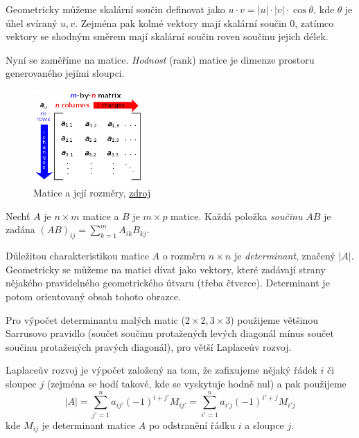 Geometricky můžeme skalární součin definovat jako
$u \cdot v = \lvert u \rvert \cdot \lvert v \rvert \cdot \cos \theta$,
kde $\theta$ je úhel svíraný $u,v$. Zejména pak kolmé
vektory mají skalární součin 0, zatímco vektory se shodným směrem
mají skalární součin roven součinu jejich délek.



Nyní se zaměříme na matice. {\em Hodnost} (rank) matice je dimenze
prostoru generovaného jejími sloupci.

\begin{figure}[h]
    \centering
    \includegraphics[width=120pt]{matrix.png}
    \caption{Matice a její rozměry, \href{https://commons.wikimedia.org/wiki/File:Matrix.svg}{zdroj}}
\end{figure}


\begin{definition}
    Nechť $A$ je $n \times m$ matice a $B$ je $m \times p$ matice.
    Každá položka {\em součinu} $AB$ je zadána
    $(AB)_{ij} = \sum^{m}_{k = 1} A_{ik} B_{kj}$.
\end{definition}


Důležitou charakteristikou matice $A$ o rozměru $n \times n$ je {\em
determinant}, značený $\lvert A \rvert$. Geometricky se můžeme na matici
dívat jako vektory, které zadávají strany nějakého pravidelného
geometrického útvaru (třeba čtverce). Determinant je potom orientovaný
obsah tohoto obrazce.

Pro výpočet determinantu malých matic ($2\times2,
3\times3$) použijeme většinou Sarrusovo pravidlo (součet součinu
protažených levých diagonál mínus součet součinu protažených pravých
diagonál), pro větší
Laplaceův rozvoj.

Laplaceův rozvoj je výpočet založený na tom, že zafixujeme nějaký řádek
$i$ či sloupec $j$ (zejména se hodí takové, kde se vyskytuje hodně nul)
a pak použijeme
\[
    \lvert A \rvert
    = \sum_{j' = 1}^{n} a_{ij'} (-1)^{i + j'} M_{ij'}
    = \sum_{i' = 1}^{n} a_{i'j} (-1)^{i' + j} M_{i'j}
\]
kde $M_{ij}$ je determinant matice $A$ po odstranění řádku $i$ a sloupce
$j$.


